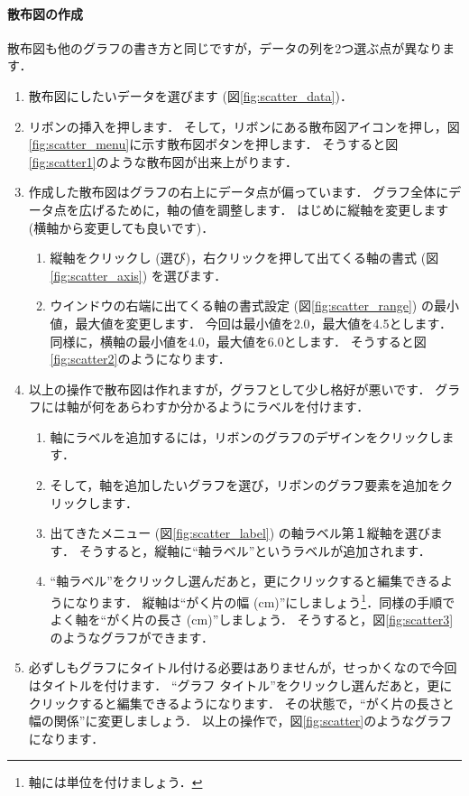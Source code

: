 \paragraph{散布図の作成}

散布図も他のグラフの書き方と同じですが，データの列を2つ選ぶ点が異なります．

\begin{enumerate}
    \item 散布図にしたいデータを選びます (図\ref{fig:scatter_data})．
    \item リボンの挿入を押します．
    そして，リボンにある散布図アイコンを押し，図\ref{fig:scatter_menu}に示す散布図ボタンを押します．
    そうすると図\ref{fig:scatter1}のような散布図が出来上がります．
    \item 作成した散布図はグラフの右上にデータ点が偏っています．
    グラフ全体にデータ点を広げるために，軸の値を調整します．
    はじめに縦軸を変更します (横軸から変更しても良いです)．
    \begin{enumerate}
        \item 縦軸をクリックし (選び)，右クリックを押して出てくる軸の書式 (図\ref{fig:scatter_axis}) を選びます．
        \item ウインドウの右端に出てくる軸の書式設定 (図\ref{fig:scatter_range}) の最小値，最大値を変更します．
        今回は最小値を2.0，最大値を4.5とします．
        同様に，横軸の最小値を4.0，最大値を6.0とします．
        そうすると図\ref{fig:scatter2}のようになります．
    \end{enumerate}
    \item 以上の操作で散布図は作れますが，グラフとして少し格好が悪いです．
    グラフには軸が何をあらわすか分かるようにラベルを付けます．
    \begin{enumerate}
        \item 軸にラベルを追加するには，リボンのグラフのデザインをクリックします．
        \item そして，軸を追加したいグラフを選び，リボンのグラフ要素を追加をクリックします．
        \item 出てきたメニュー (図\ref{fig:scatter_label}) の軸ラベル第１縦軸を選びます．
        そうすると，縦軸に``軸ラベル''というラベルが追加されます．
        \item ``軸ラベル''をクリックし選んだあと，更にクリックすると編集できるようになります．
        縦軸は``がく片の幅 (cm)''にしましょう\footnote{軸には単位を付けましょう．}．同様の手順でよく軸を``がく片の長さ (cm)''しましょう．
        そうすると，図\ref{fig:scatter3}のようなグラフができます．
    \end{enumerate}
    \item 必ずしもグラフにタイトル付ける必要はありませんが，せっかくなので今回はタイトルを付けます．
    ``グラフ タイトル''をクリックし選んだあと，更にクリックすると編集できるようになります．
    その状態で，``がく片の長さと幅の関係''に変更しましょう．
    以上の操作で，図\ref{fig:scatter}のようなグラフになります．
\end{enumerate}


